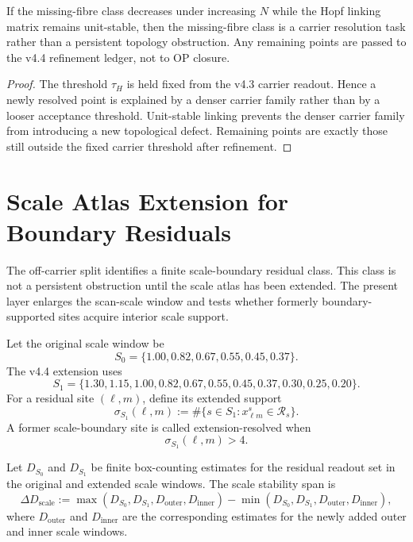 \begin{theorem}
If the missing-fibre class decreases under increasing \(N\) while the Hopf
linking matrix remains unit-stable, then the missing-fibre class is a carrier
resolution task rather than a persistent topology obstruction.  Any remaining
points are passed to the v4.4 refinement ledger, not to OP closure.
\end{theorem}

\begin{proof}
The threshold \(\tau_H\) is held fixed from the v4.3 carrier readout.  Hence a
newly resolved point is explained by a denser carrier family rather than by a
looser acceptance threshold.  Unit-stable linking prevents the denser carrier
family from introducing a new topological defect.  Remaining points are exactly
those still outside the fixed carrier threshold after refinement.
\end{proof}



\section{Scale Atlas Extension for Boundary Residuals}
\label{sec:scale-atlas-extension-boundary-residuals}

The off-carrier split identifies a finite scale-boundary residual class.  This
class is not a persistent obstruction until the scale atlas has been extended.
The present layer enlarges the scan-scale window and tests whether formerly
boundary-supported sites acquire interior scale support.

\begin{definition}
Let the original scale window be
\[
    S_0=\{1.00,0.82,0.67,0.55,0.45,0.37\}.
\]
The v4.4 extension uses
\[
    S_1=\{1.30,1.15,1.00,0.82,0.67,0.55,0.45,0.37,0.30,0.25,0.20\}.
\]
For a residual site \((\ell,m)\), define its extended support
\[
    \sigma_{S_1}(\ell,m)
    :=
    \#\{s\in S_1: x_{\ell m}^{s}\in\mathcal R_s\}.
\]
A former scale-boundary site is called extension-resolved when
\[
    \sigma_{S_1}(\ell,m)>4.
\]
\end{definition}

\begin{definition}
Let \(D_{S_0}\) and \(D_{S_1}\) be finite box-counting estimates for the
residual readout set in the original and extended scale windows.  The scale
stability span is
\[
    \Delta D_{\mathrm{scale}}
    :=
    \max(D_{S_0},D_{S_1},D_{\mathrm{outer}},D_{\mathrm{inner}})
    -
    \min(D_{S_0},D_{S_1},D_{\mathrm{outer}},D_{\mathrm{inner}}),
\]
where \(D_{\mathrm{outer}}\) and \(D_{\mathrm{inner}}\) are the corresponding
estimates for the newly added outer and inner scale windows.
\end{definition}

